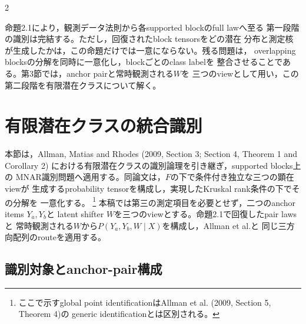 \documentclass[a4paper,10pt]{article}
\begin{document}
\begin{multicols}{2}
\begin{center}
\begin{minipage}{\linewidth}
\centering

\label{fig:identification-flow}
\end{minipage}
\end{center}

命題2.1により，観測データ法則から各supported blockのfull lawへ至る
第一段階の識別は完結する。ただし，回復されたblock tensorsをどの潜在
分布と測定核が生成したかは，この命題だけでは一意にならない。残る問題は，
overlapping blocksの分解を同時に一意化し，blockごとのclass labelを
整合させることである。第3節では，anchor pairと常時観測される$W$を
三つのviewとして用い，この第二段階を有限潜在クラスについて解く。

\section{有限潜在クラスの統合識別}
本節は，Allman, Matias and Rhodes (2009, Section 3; Section 4, Theorem 1 and
Corollary 2) における有限潜在クラスの識別論理を引き継ぎ，supported blocks上の
MNAR識別問題へ適用する。同論文は，$F$の下で条件付き独立な三つの顕在viewが
生成するprobability tensorを構成し，実現したKruskal rank条件の下でその分解を
一意化する。%
\footnote{ここで示すglobal point identificationはAllman et al. (2009, Section 5, Theorem 4)の
generic identificationとは区別される。}
本稿では第三の測定項目を必要とせず，二つのanchor items $Y_a,Y_b$と
latent shifter $W$を三つのviewとする。命題2.1で回復したpair lawsと
常時観測される$W$から$P(Y_a,Y_b,W\mid X)$を構成し，Allman et al.と
同じ三方向配列のrouteを適用する。

\subsection{識別対象とanchor-pair構成}


\end{multicols}
\end{document}
